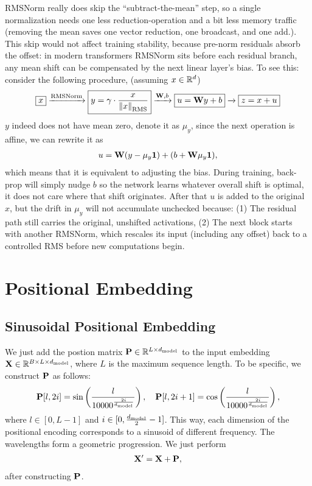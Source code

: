 \documentclass[11pt]{article}  %
\begin{document}
RMSNorm really does skip the “subtract-the-mean” step, so a single normalization needs one less reduction-operation and a bit less memory traffic (removing the mean saves one vector reduction, one broadcast, and one add.). 
This skip would not affect training stability, because pre-norm residuals absorb the offset: in modern transformers RMSNorm sits before each residual branch, any mean shift can be compensated by the next linear layer's bias.
To see this: consider the following procedure, (assuming $x \in \mathbb{R}^d$)
\begin{align*}
  \boxed{x} \xrightarrow{\text{RMSNorm}} \boxed{y = \gamma \cdot \frac{x}{\left\lVert x \right\rVert_{\text{RMS}}}} \xrightarrow{\mathbf{W}, b} \boxed{u = \mathbf{W} y + b} \xrightarrow{} \boxed{z = x + u}
\end{align*}
$y$ indeed does not have mean zero, denote it as $\mu_{y}$, since the next operation is affine, we can rewrite it as 
\begin{align*}
  u = \mathbf{W}(y - \mu_{y}{\bf{1}}) + (b + \mathbf{W}\mu_{y}{\bf{1}}),
\end{align*}
which means that it is equivalent to adjusting the bias. 
During training, back-prop will simply nudge $b$ so the network learns whatever overall shift is optimal, it does not care where that shift originates.
After that $u$ is added to the original $x$, but the drift in $\mu_{y}$ will not accumulate unchecked because: (1) The residual path still carries the original, unshifted activations, (2) The next block starts with another RMSNorm, which rescales its input (including any offset) back to a controlled RMS before new computations begin.



\section{Positional Embedding}


\subsection{Sinusoidal Positional Embedding}
We just add the postion matrix $\mathbf{P} \in \mathbb{R}^{L \times d_{\text{model}}}$ to the input embedding $\mathbf{X} \in \mathbb{R}^{B \times L \times d_{\text{model}}}$, where $L$ is the maximum sequence length.
To be specific, we construct $\mathbf{P}$ as follows:
\begin{align*}
  \mathbf{P}[l, 2i] = \sin\left( \frac{l}{10000^{\frac{2i}{d_{\text{model}}}}} \right), \quad \mathbf{P}[l, 2i + 1] = \cos\left( \frac{l}{10000^{\frac{2i}{d_{\text{model}}}}} \right),
\end{align*}
where $l \in [0, L - 1]$ and $i \in [0, \frac{d_{\text{model}}}{2} - 1]$.
This way, each dimension of the positional encoding corresponds to a sinusoid of different frequency.
The wavelengths form a geometric progression.
We just perform 
\begin{align*}
  \mathbf{X}^\prime = \mathbf{X} + \mathbf{P},
\end{align*}
after constructing $\mathbf{P}$.
\end{document}
